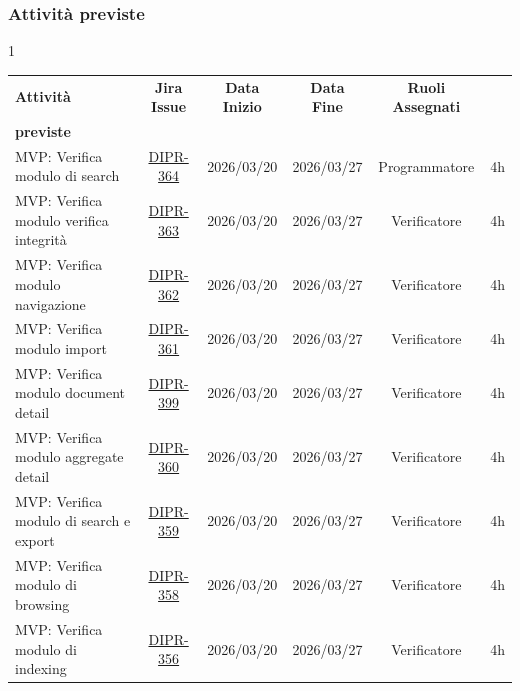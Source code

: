 \documentclass[a4paper,12pt]{article}
\begin{document}
\subsubsection{Attività previste}
\begin{spacing}{1}
    \small
\begin{longtable}{|p{4cm}|c|c|c|c|c|}
        \hline
        \rowcolor{zpusgreen!30}
        \textbf{Attività} & \textbf{Jira Issue} & \textbf{Data Inizio} & \textbf{Data Fine} & \textbf{Ruoli Assegnati} & \begin{tabular}[c]{@{}c@{}} \textbf{Ore} \\ \textbf{previste} \end{tabular} \\
        \hline
        [BACKEND] MVP: Verifica modulo di search & \href{https://7zpus.atlassian.net/browse/DIPR-364}{DIPR-364} & 2026/03/20 & 2026/03/27 & Programmatore & 4h \\
        \hline
        [FRONTEND] MVP: Verifica modulo verifica integrità & \href{https://7zpus.atlassian.net/browse/DIPR-363}{DIPR-363} & 2026/03/20 & 2026/03/27 & Verificatore & 4h \\
        \hline
        [FRONTEND] MVP: Verifica modulo navigazione & \href{https://7zpus.atlassian.net/browse/DIPR-362}{DIPR-362} & 2026/03/20 & 2026/03/27 & Verificatore & 4h \\
        \hline
        [FRONTEND] MVP: Verifica modulo import & \href{https://7zpus.atlassian.net/browse/DIPR-361}{DIPR-361} & 2026/03/20 & 2026/03/27 & Verificatore & 4h \\
        \hline
        [FRONTEND] MVP: Verifica modulo document detail & \href{https://7zpus.atlassian.net/browse/DIPR-399}{DIPR-399} & 2026/03/20 & 2026/03/27 & Verificatore & 4h \\
        \hline
        [FRONTEND] MVP: Verifica modulo aggregate detail& \href{https://7zpus.atlassian.net/browse/DIPR-360}{DIPR-360} & 2026/03/20 & 2026/03/27 & Verificatore & 4h \\
        \hline
        [BACKEND] MVP: Verifica modulo di search e export & \href{https://7zpus.atlassian.net/browse/DIPR-359}{DIPR-359} & 2026/03/20 & 2026/03/27 & Verificatore & 4h \\
        \hline
        [BACKEND] MVP: Verifica modulo di browsing & \href{https://7zpus.atlassian.net/browse/DIPR-358}{DIPR-358} & 2026/03/20 & 2026/03/27 & Verificatore & 4h \\
        \hline
        [BACKEND] MVP: Verifica modulo di indexing & \href{https://7zpus.atlassian.net/browse/DIPR-356}{DIPR-356} & 2026/03/20 & 2026/03/27 & Verificatore & 4h \\

\end{longtable}
\end{spacing}
\end{document}

